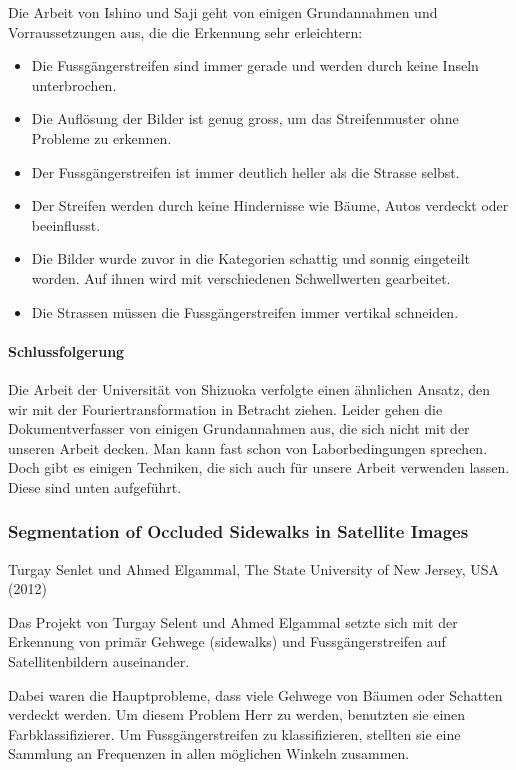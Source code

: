 Die Arbeit von Ishino und Saji geht von einigen Grundannahmen und Vorraussetzungen aus, die die Erkennung sehr erleichtern:

\begin{itemize}
	\item Die Fussgängerstreifen sind immer gerade und werden durch keine Inseln unterbrochen.
	\item Die Auflösung der Bilder ist genug gross, um das Streifenmuster ohne Probleme zu erkennen.
	\item Der Fussgängerstreifen ist immer deutlich heller als die Strasse selbst.
	\item Der Streifen werden durch keine Hindernisse wie Bäume, Autos verdeckt oder beeinflusst.
	\item Die Bilder wurde zuvor in die Kategorien schattig und sonnig eingeteilt worden. Auf ihnen wird mit verschiedenen Schwellwerten gearbeitet.
	\item Die Strassen müssen die Fussgängerstreifen immer vertikal schneiden.
\end{itemize}

\paragraph{Schlussfolgerung}
Die Arbeit der Universität von Shizuoka verfolgte einen ähnlichen Ansatz, den wir mit der Fouriertransformation in Betracht ziehen. Leider gehen die Dokumentverfasser von einigen Grundannahmen aus, die sich nicht mit der unseren Arbeit decken. Man kann fast schon von Laborbedingungen sprechen.
Doch gibt es einigen Techniken, die sich auch für unsere Arbeit verwenden lassen. Diese sind unten aufgeführt.

\subsubsection{Segmentation of Occluded Sidewalks in Satellite Images}
Turgay Senlet und Ahmed Elgammal, The State University of New Jersey, USA (2012)\cite{senlet2012segmentation} \newline

Das Projekt von Turgay Selent und Ahmed Elgammal setzte sich mit der Erkennung von primär Gehwege (sidewalks) und Fussgängerstreifen auf Satellitenbildern auseinander.

Dabei waren die Hauptprobleme, dass viele Gehwege von Bäumen oder Schatten verdeckt werden. Um diesem Problem Herr zu werden, benutzten sie einen Farbklassifizierer.
Um Fussgängerstreifen zu klassifizieren, stellten sie eine Sammlung an Frequenzen in allen möglichen Winkeln zusammen. 

